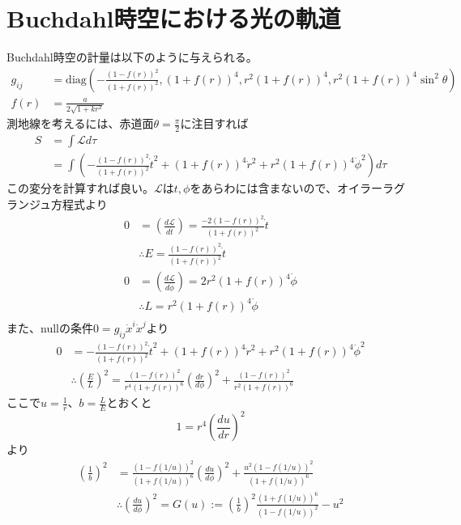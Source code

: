 \documentclass[dvipdfmx]{report} %
\begin{document}
\section{Buchdahl時空における光の軌道}
Buchdahl時空の計量は以下のように与えられる。
\begin{equation*}
\begin{split}
	g_{ij} &= \mathrm{diag}
	\left(
		- \frac{(1 - f(r))^2}{(1 + f(r))^2},
		(1 + f(r))^4,
		r^2(1 + f(r))^4 ,
		r^2 (1 + f(r))^4 \sin ^2 \theta 
	\right)\\
	f(r) &= \frac{a}{2\sqrt{1 + k r^2}} 
\end{split}
\end{equation*}
測地線を考えるには、赤道面$ \theta = \frac{\pi}{2} $に注目すれば
\begin{equation*}
\begin{split}
	S &= \int \mathcal{L} d\tau \\
	&= \int \left(
		- \frac{(1 - f(r))^2}{(1 + f(r))^2} \dot{t}^2
		+ (1 + f(r))^4 \dot{r}^2
		+ r^2(1 + f(r))^4 \dot{\phi}^2
	\right) d\tau
\end{split}
\end{equation*}
この変分を計算すれば良い。$ \mathcal{L} $は$t, \phi$をあらわには含まないので、オイラーラグランジュ方程式より
\begin{equation*}
\begin{split}
	0 &
		= \left( \frac{d\mathcal{L}}{d\dot{t}} \right)
		= \frac{-2 (1 - f(r))^2 }{(1 + f(r))^2} \dot{t}\\
	&\therefore  E = \frac{(1 - f(r))^2 }{(1 + f(r))^2} \dot{t}\\
	0 &
		= \left( \frac{d\mathcal{L}}{d\dot{\phi}} \right)
		= 2 r^2 (1 + f(r))^4  \dot{\phi}\\
	&\therefore  L = r^2 (1 + f(r))^4  \dot{\phi}\\
\end{split}
\end{equation*}
また、nullの条件$0 = g_{ij}\dot{x}^i\dot{x}^j$より
\begin{equation*}
\begin{split}
	0 &=
		- \frac{(1 - f(r))^2}{(1 + f(r))^2} \dot{t}^2
		+ (1 + f(r))^4 \dot{r}^2
		+ r^2(1 + f(r))^4 \dot{\phi}^2\\
	& \therefore 
		\left( \frac{E}{L} \right)^2 =
			\frac{(1 - f(r))^2}{r^4 (1 + f(r))^6} \left( \frac{dr}{d\phi} \right)^2
			+ \frac{(1 - f(r))^2}{r^2 (1 + f(r))^6}
\end{split}
\end{equation*}
ここで$u = \frac{1}{r}$、$b = \frac{L}{E}$とおくと
\[ 1 = r^4 \left( \frac{du}{dr} \right) ^2 \]より
\begin{equation*}
\begin{split}
	\left( \frac{1}{b} \right)^2 &=
		\frac{(1 - f(1/u))^2}{(1 + f(1/u))^6} \left( \frac{du}{d\phi} \right)^2
		+ \frac{u^2 (1 - f(1/u))^2}{(1 + f(1/u))^6}\\
	& \therefore \left( \frac{du}{d\phi} \right)^2 = G(u) :=
		\left( \frac{1}{b} \right)^2 \frac{(1 + f(1/u))^6}{(1 - f(1/u))^2} - u^2
\end{split}
\end{equation*}
\end{document}

